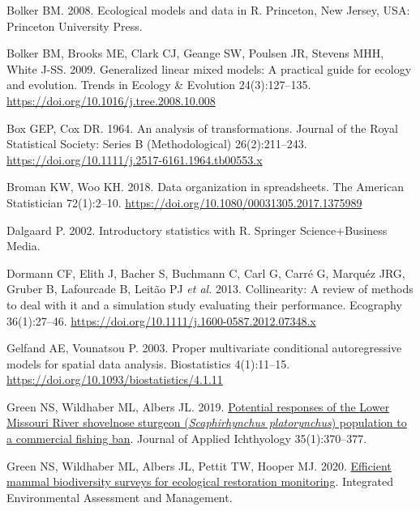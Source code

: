 \documentclass[
  13,
  letterpaper,
]{report}
\newlength{\cslhangindent}
\newenvironment{CSLReferences}[2] %
 {\begin{list}{}{%
  \setlength{\itemindent}{0pt}
  \setlength{\leftmargin}{0pt}
  \setlength{\parsep}{0pt}
  \ifodd #1
   \setlength{\leftmargin}{\cslhangindent}
   \setlength{\itemindent}{-1\cslhangindent}
  \fi
  \setlength{\itemsep}{#2\baselineskip}}}
 {\end{list}}
\begin{document}
\label{refs}
\begin{CSLReferences}{1}{1}
Bolker BM. 2008. Ecological models and data in {R}. Princeton, New
Jersey, USA: Princeton University Press.

Bolker BM, Brooks ME, Clark CJ, Geange SW, Poulsen JR, Stevens MHH,
White J-SS. 2009. Generalized linear mixed models: A practical guide for
ecology and evolution. Trends in Ecology \& Evolution 24(3):127--135.
\url{https://doi.org/10.1016/j.tree.2008.10.008}

Box GEP, Cox DR. 1964. An analysis of transformations. Journal of the
Royal Statistical Society: Series B (Methodological) 26(2):211--243.
\url{https://doi.org/10.1111/j.2517-6161.1964.tb00553.x}

Broman KW, Woo KH. 2018. Data organization in spreadsheets. The American
Statistician 72(1):2--10.
\url{https://doi.org/10.1080/00031305.2017.1375989}

Dalgaard P. 2002. Introductory statistics with {R}. Springer
Science+Business Media.

Dormann CF, Elith J, Bacher S, Buchmann C, Carl G, Carré G, Marquéz JRG,
Gruber B, Lafourcade B, Leitão PJ \emph{et al.} 2013. Collinearity: A
review of methods to deal with it and a simulation study evaluating
their performance. Ecography 36(1):27--46.
\url{https://doi.org/10.1111/j.1600-0587.2012.07348.x}

Gelfand AE, Vounatsou P. 2003. Proper multivariate conditional
autoregressive models for spatial data analysis. Biostatistics
4(1):11--15. \url{https://doi.org/10.1093/biostatistics/4.1.11}

Green NS, Wildhaber ML, Albers JL. 2019.
\href{https://doi.org/10.1111/jai.13701}{Potential responses of the
{L}ower {M}issouri {R}iver shovelnose sturgeon (\emph{{S}caphirhynchus
platorynchus}) population to a commercial fishing ban}. Journal of
Applied Ichthyology 35(1):370--377.

Green NS, Wildhaber ML, Albers JL, Pettit TW, Hooper MJ. 2020.
\href{https://doi.org/10.1002/ieam.4324}{Efficient mammal biodiversity
surveys for ecological restoration monitoring}. Integrated Environmental
Assessment and Management.


\end{CSLReferences}
\end{document}
